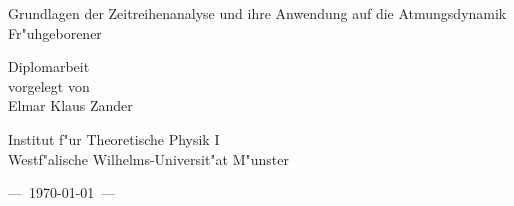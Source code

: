 \hbox{}
\vspace{3cm}

\begin{center}
\sectfont \LARGE
Grundlagen der Zeitreihenanalyse und ihre Anwendung auf die Atmungsdynamik
Fr"uhgeborener\\
\end{center}

\vspace{3cm}
\begin{center}
\large
Diplomarbeit \\
vorgelegt von \\
Elmar Klaus Zander
\end{center}

\vspace{3cm}
\begin{center}
\large
Institut f"ur Theoretische Physik I\\Westf"alische Wilhelms-Universit"at M"unster
\end{center}

\vspace{3cm}
\begin{center}
\large
---\ \today\ --- 
\end{center}



